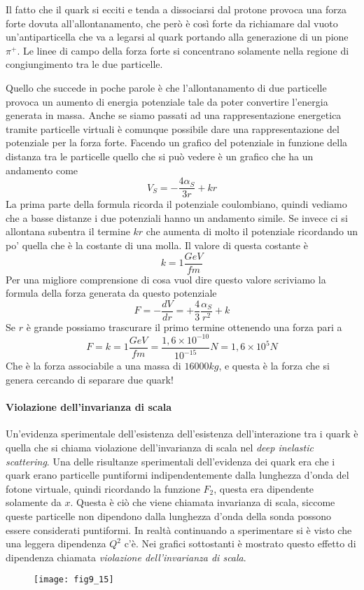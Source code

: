 Il fatto che il quark si ecciti e tenda a dissociarsi dal protone provoca una forza forte dovuta all'allontanamento, che però è così forte da richiamare dal vuoto un'antiparticella che va a legarsi al quark portando alla generazione di un pione $\pi^+$.
Le linee di campo della forza forte si concentrano solamente nella regione di congiungimento tra le due particelle.

Quello che succede in poche parole è che l'allontanamento di due particelle provoca un aumento di energia potenziale tale da poter convertire l'energia generata in massa.
Anche se siamo passati ad una rappresentazione energetica tramite particelle virtuali è comunque possibile dare una rappresentazione del potenziale per la forza forte.
Facendo un grafico del potenziale in funzione della distanza tra le particelle quello che si può vedere è un grafico che ha un andamento come 
\begin{equation}
V_S=-\frac{4\alpha_S}{3r}+kr
\end{equation}
La prima parte della formula ricorda il potenziale coulombiano, quindi vediamo che a basse distanze i due potenziali hanno un andamento simile.
Se invece ci si allontana subentra il termine $kr$ che aumenta di molto il potenziale ricordando un po' quella che è la costante di una molla.
Il valore di questa costante è
\begin{equation}
k=1\frac{GeV}{fm}
\end{equation}
Per una migliore comprensione di cosa vuol dire questo valore scriviamo la formula della forza generata da questo potenziale
\begin{equation}
F=-\frac{dV}{dr}=+\frac{4}{3}\frac{\alpha_S}{r^2}+k
\end{equation}
Se $r$ è grande possiamo trascurare il primo termine ottenendo una forza pari a
\begin{equation}
F=k=1\frac{GeV}{fm}=\frac{1,6\times10^{-10}}{10^{-15}}N=1,6\times10^5N
\end{equation}
Che è la forza associabile a una massa di $16000kg$, e questa è la forza che si genera cercando di separare due quark!

\paragraph{Violazione dell'invarianza di scala}
Un'evidenza sperimentale dell'esistenza dell'esistenza dell'interazione tra i quark è quella che si chiama violazione dell'invarianza di scala nel \emph{deep inelastic scattering}.
Una delle risultanze sperimentali dell'evidenza dei quark era che i quark erano particelle puntiformi indipendentemente dalla lunghezza d'onda del fotone virtuale, quindi ricordando la funzione $F_2$, questa era dipendente solamente da $x$. 
Questa è ciò che viene chiamata invarianza di scala, siccome queste particelle non dipendono dalla lunghezza d'onda della sonda possono essere considerati puntiformi.
In realtà continuando a sperimentare si è visto che una leggera dipendenza $Q^2$ c'è.
Nei grafici sottostanti è mostrato questo effetto di dipendenza chiamata \emph{violazione dell'invarianza di scala}.
\begin{figure}
\centering
\texttt{[image: fig9\_15]}
\end{figure}

